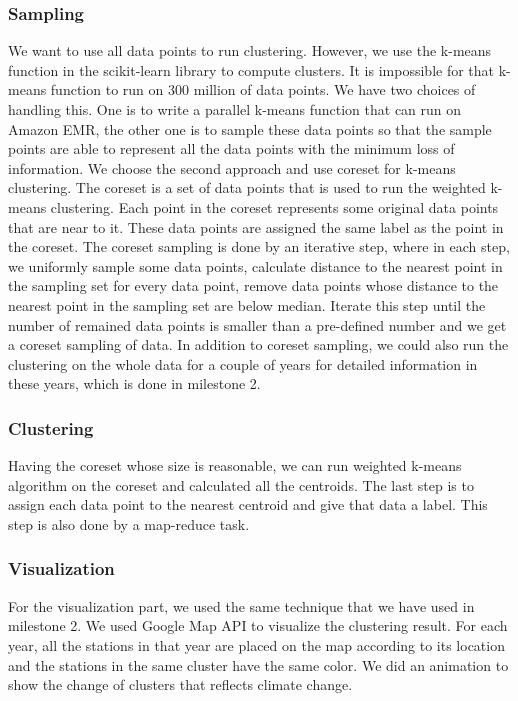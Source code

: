 \subsubsection{Sampling}
We want to use all data points to run clustering. However, we use the k-means function in the scikit-learn library to compute clusters. It is impossible for that k-means function to run on 300 million of data points. We have two choices of handling this. One is to write a parallel k-means function that can run on Amazon EMR, the other one is to sample these data points so that the sample points are able to represent all the data points with the minimum loss of information. We choose the second approach and use coreset for k-means clustering. The coreset is a set of data points that is used to run the weighted k-means clustering. Each point in the coreset represents some original data points that are near to it. These data points are assigned the same label as the point in the coreset. The coreset sampling is done by an iterative step, where in each step, we uniformly sample some data points, calculate distance to the nearest point in the sampling set for every data point, remove data points whose distance to the nearest point in the sampling set are below median. Iterate this step until the number of remained data points is smaller than a pre-defined number and we get a coreset sampling of data. In addition to coreset sampling, we could also run the clustering on the whole data for a couple of years for detailed information in these years, which is done in milestone 2.


\subsubsection{Clustering}
Having the coreset whose size is reasonable, we can run weighted k-means algorithm on the coreset and calculated all the centroids. The last step is to assign each data point to the nearest centroid and give that data a label. This step is also done by a map-reduce task.

\subsubsection{Visualization}
For the visualization part, we used the same technique that we have used in milestone 2. We used Google Map API to visualize the clustering result. For each year, all the stations in that year are placed on the map according to its location and the stations in the same cluster have the same color. We did an animation to show the change of clusters that reflects climate change.

